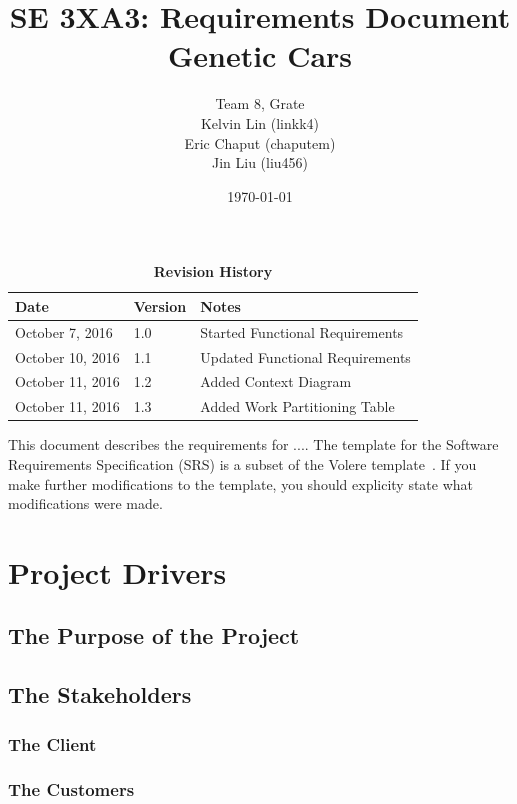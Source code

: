 \documentclass[12pt, titlepage]{article}
\title{SE 3XA3: Requirements Document\\Genetic Cars}
\author{Team 8, Grate
		\\ Kelvin Lin (linkk4)
		\\ Eric Chaput (chaputem)
		\\ Jin Liu (liu456)
}
\date{\today}
\begin{document}
\maketitle

\tableofcontents
\listoftables
\listoffigures

\begin{table}[h]
\caption{\bf Revision History}
\begin{tabularx}{\textwidth}{p{3.5cm}p{2cm}X}
\toprule {\bf Date} & {\bf Version} & {\bf Notes}\\
\midrule
October 7, 2016 & 1.0 & Started Functional Requirements\\
October 10, 2016 & 1.1 & Updated Functional Requirements\\
October 11, 2016 & 1.2 & Added Context Diagram\\
October 11, 2016 & 1.3 & Added Work Partitioning Table\\
\bottomrule
\end{tabularx}
\end{table}

\newpage


This document describes the requirements for ....  The template for the Software
Requirements Specification (SRS) is a subset of the Volere
template~\citep{RobertsonAndRobertson2012}.  If you make further modifications
to the template, you should explicity state what modifications were made.

\section{Project Drivers}

\subsection{The Purpose of the Project}

\subsection{The Stakeholders}

\subsubsection{The Client}

\subsubsection{The Customers}
\end{document}
